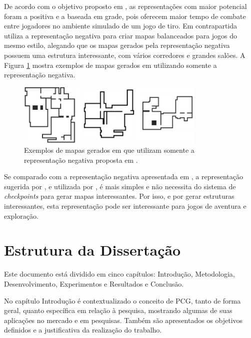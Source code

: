 De acordo com o objetivo proposto em \cite{cardamone2011evolving}, as representações com maior potencial foram a positiva e a baseada em grade, pois oferecem maior tempo de combate entre jogadores no ambiente simulado de um jogo de tiro. Em contrapartida \cite{lanzi2014evolving} utiliza a representação negativa para criar mapas balanceados para jogos do mesmo estilo, alegando que os mapas gerados pela representação negativa possuem uma estrutura interessante, com vários corredores e grandes salões. A Figura \ref{fig:lanzi2014evolving} mostra exemplos de mapas gerados em \cite{lanzi2014evolving} utilizando somente a representação negativa.

\begin{figure}[htb]
	\begin{center}
		\includegraphics[width=0.8\textwidth]{Imagens/lanzi2014evolving.jpg}
		\caption{Exemplos de mapas gerados em \cite{lanzi2014evolving} que utilizam somente a representação negativa proposta em \cite{cardamone2011evolving}.}
		\label{fig:lanzi2014evolving}
	\end{center}
\end{figure}

Se comparado com a representação negativa apresentada em \cite{ashlock2011search}, a representação sugerida por \cite{cardamone2011evolving}, e utilizada por \cite{lanzi2014evolving}, é mais simples e não necessita do sistema de \emph{checkpoints} para gerar mapas interessantes. Por isso, e por gerar estruturas interessantes, esta representação pode ser interessante para jogos de aventura e exploração.

\section{Estrutura da Dissertação}

Este documento está dividido em cinco capítulos: Introdução, Metodologia, Desenvolvimento, Experimentos e Resultados e Conclusão.

No capítulo Introdução é contextualizado o conceito de PCG, tanto de forma geral, quanto específica em relação à pesquisa, mostrando algumas de suas aplicações no mercado e em pesquisas. Também são apresentados os objetivos definidos e a justificativa da realização do trabalho.


